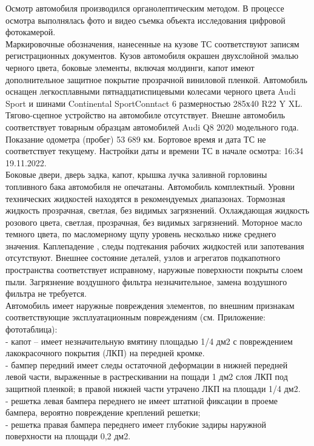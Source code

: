 Осмотр автомобиля производился  органолептическим методом. В процессе осмотра выполнялась фото и видео съемка объекта исследования цифровой фотокамерой.\\ 
Маркировочные обозначения, нанесенные на кузове ТС соответствуют записям регистрационных документов. Кузов автомобиля окрашен двухслойной эмалью черного цвета, боковые элементы, включая молдинги,  капот имеют дополнительное защитное покрытие прозрачной виниловой пленкой. Автомобиль оснащен легкосплавными пятнадцатиспицевыми колесами черного цвета Audi Sport и шинами  Continental SportConntact 6 размерностью  285х40 R22 Y XL. Тягово-сцепное устройство на автомобиле отсутствует. Внешне автомобиль соответствует товарным образцам автомобилей Audi Q8 2020 модельного года.    Показание одометра (пробег)  53 689 км.  Бортовое время и дата ТС  не соответствует текущему. Настройки даты и времени ТС в начале осмотра: 16:34  19.11.2022. \\
Боковые двери, дверь задка, капот, крышка лучка заливной горловины топливного бака автомобиля  не опечатаны. Автомобиль комплектный. Уровни технических жидкостей находятся в рекомендуемых диапазонах.  Тормозная жидкость прозрачная, светлая, без видимых загрязнений. Охлаждающая жидкость розового цвета, светлая, прозрачная, без видимых загрязнений. Моторное масло темного цвета, по масломерному щупу уровень несколько ниже среднего значения. Каплепадение \cite{техрегтамсоюз:тр}, следы  подтекания рабочих жидкостей  или запотевания отсутствуют. Внешнее состояние деталей, узлов и агрегатов подкапотного пространства соответствует исправному, наружные поверхности покрыты  слоем пыли. Загрязнение воздушного фильтра незначительное, замена воздушного фильтра не требуется. \\
  Автомобиль   имеет  наружные повреждения  элементов, по внешним признакам соответствующие эксплуатационным повреждениям (см. Приложение: фототаблица):\\
 - капот – имеет незначительную вмятину площадью 1/4 дм2  с повреждением лакокрасочного покрытия (ЛКП) на передней кромке. \\
 - бампер передний имеет следы остаточной деформации  в нижней передней левой части, выраженные в   растрескивании на пощади 1 дм2 слоя ЛКП под защитной пленкой; в правой нижней части  утрачено ЛКП на площади 1/4 дм2. \\
 - решетка левая бампера переднего  не имеет  штатной фиксации  в проеме бампера, вероятно  повреждение креплений решетки;\\
  - решетка правая бампера переднего  имеет глубокие  задиры наружной поверхности  на площади 0,2 дм2. \\
